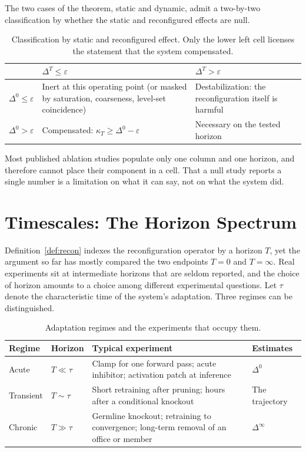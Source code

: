 \documentclass[11pt]{article}
\theoremstyle{definition}
\theoremstyle{remark}
\begin{document}
The two cases of the theorem, static and dynamic, admit a two-by-two classification by whether the static and reconfigured effects are null.

\begin{table}[h]
\centering
\small
\begin{tabular}{p{3.2cm}p{4.0cm}p{5.2cm}}
\toprule
 & $\Delta^T\le\varepsilon$ & $\Delta^T>\varepsilon$\\
\midrule
$\Delta^0\le\varepsilon$ & Inert at this operating point (or masked by saturation, coarseness, level-set coincidence) & Destabilization: the reconfiguration itself is harmful\\
$\Delta^0>\varepsilon$ & Compensated: $\kappa_T\ge\Delta^0-\varepsilon$ & Necessary on the tested horizon\\
\bottomrule
\end{tabular}
\caption{Classification by static and reconfigured effect. Only the lower left cell licenses the statement that the system compensated.}
\label{tab:class}
\end{table}

Most published ablation studies populate only one column and one horizon, and therefore cannot place their component in a cell. That a null study reports a single number is a limitation on what it can say, not on what the system did.


\section{Timescales: The Horizon Spectrum}\label{sec:time}

Definition~\ref{def:recon} indexes the reconfiguration operator by a horizon $T$, yet the argument so far has mostly compared the two endpoints $T=0$ and $T=\infty$. Real experiments sit at intermediate horizons that are seldom reported, and the choice of horizon amounts to a choice among different experimental questions. Let $\tau$ denote the characteristic time of the system's adaptation. Three regimes can be distinguished.

\begin{table}[h]
\centering
\small
\begin{tabular}{p{2.0cm}p{2.2cm}p{5.6cm}p{2.2cm}}
\toprule
Regime & Horizon & Typical experiment & Estimates\\
\midrule
Acute & $T\ll\tau$ & Clamp for one forward pass; acute inhibitor; activation patch at inference & $\Delta^0$\\
Transient & $T\sim\tau$ & Short retraining after pruning; hours after a conditional knockout & The trajectory\\
Chronic & $T\gg\tau$ & Germline knockout; retraining to convergence; long-term removal of an office or member & $\Delta^\infty$\\
\bottomrule
\end{tabular}
\caption{Adaptation regimes and the experiments that occupy them.}
\end{table}
\end{document}
